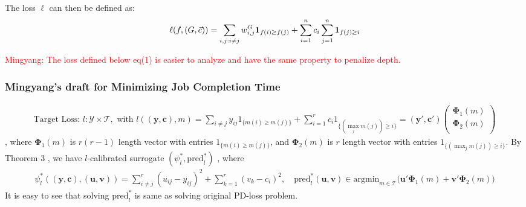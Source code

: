 The loss $\ell$ can then be defined as:
\begin{align*}
  \ell(f, (G, \vec{c}))
  = \sum_{i,j: i \neq j} w_{i,j}^G {\mathbf 1}_{f(i) \geq f(j)}
  + \sum_{i=1}^n c_i \sum_{j=1}^n {\mathbf 1}_{f(j) \geq i}
\end{align*}

\textcolor{red}{Mingyang: The loss defined below eq(1) is easier to analyze and have the same property to penalize depth.}


\subsubsection{Mingyang's draft for Minimizing Job Completion Time}


\begin{equation}\label{eq:pdloss}
\begin{split}
\text{Target Loss: }l: \mathcal{Y}\times\mathcal{T}, \text{ with } l((\mathbf{y},\mathbf{c}),  m)=\sum\limits_{i\not=j}y_{ij}1_{\{m(i)\geq m(j)\}}+\sum\limits_{i=1}^rc_i1_{\{(\max_jm(j))\geq i\}}=(\mathbf{y}', \mathbf{c}')\begin{pmatrix} \mathbf{\Phi}_1(m) \\\mathbf{\Phi}_2(m) \\\end{pmatrix} 
\end{split}
\end{equation}
, where $\mathbf{\Phi}_1(m)$ is $r(r-1)$ length vector with entries $1_{\{m(i)\geq m(j)\}}$, and  $\mathbf{\Phi}_2(m)$ is $r$ length vector with entries $1_{\{(\max_jm(j))\geq i\}}$.  By Theorem 3 \cite{Ramaswamy2013}, we have $l$-calibrated surrogate $(\psi_l^*, \text{pred}_l^*)$ , where
\begin{equation*}
\begin{split}
\psi_l^*((\mathbf{y},\mathbf{c}), (\mathbf{u}, \mathbf{v}))=\sum\limits_{i\not=j}^{r}(u_{ij}-y_{ij})^2+\sum\limits_{k=1}^r(v_k-c_i)^2,\quad \text{pred}_l^*(\mathbf{u}, \mathbf{v})\in\text{argmin}_{m\in \mathcal{T}}\bigg(\mathbf{u}'\mathbf{\Phi}_1(m)+\mathbf{v}'\mathbf{\Phi}_2(m)\bigg)
\end{split}
\end{equation*}
It is easy to see that solving $\text{pred}_l^*$ is same as solving original PD-loss problem. 



